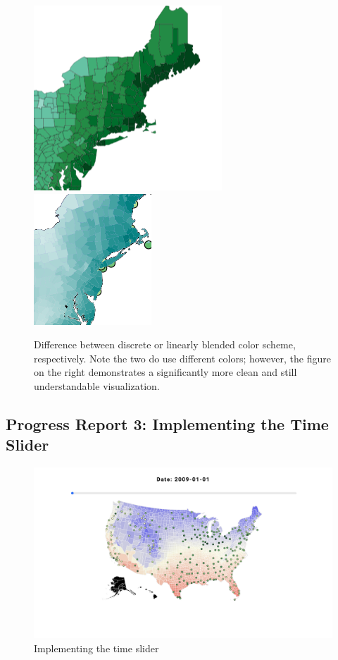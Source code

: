 \documentclass[10pt,twocolumn,twoside]{opticajnl}
\begin{document}
\begin{figure}
	\centering
	\includegraphics[scale=0.45]{images/sequentialNE.png}
	\includegraphics[scale=0.45]{images/gradualNE.png}
	\caption{Difference between discrete or linearly blended color scheme, respectively. Note the two do use different colors; however, the figure on the right demonstrates a significantly more clean and still understandable visualization.}
\end{figure}

\subsection {Progress Report 3: Implementing the Time Slider}

\begin{figure}
    \centering
    \includegraphics[scale=0.10]{images/img3.png}
    \caption{Implementing the time slider}
\end{figure}
\end{document}
